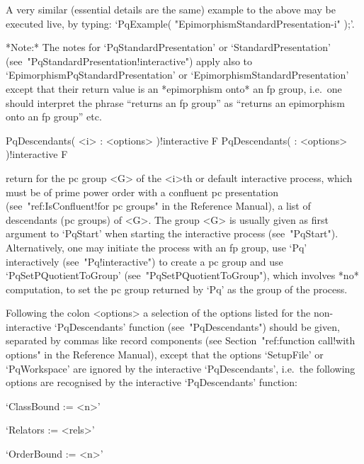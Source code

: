 A very similar (essential details are the same) example to the above may
be executed live, by typing:
`PqExample( "EpimorphismStandardPresentation-i" );'.

*Note:*
The  notes   for   `PqStandardPresentation'   or   `StandardPresentation'
(see~"PqStandardPresentation!interactive")      apply       also       to
`EpimorphismPqStandardPresentation' or  `EpimorphismStandardPresentation'
except that their return value is an  *epimorphism  onto*  an  fp  group,
i.e.~one should interpret the phrase ``returns an fp group'' as ``returns
an epimorphism onto an fp group'' etc.

\>PqDescendants( <i> : <options> )!{interactive} F
\>PqDescendants( : <options> )!{interactive} F

return for the pc group <G> of the <i>th or default interactive  {\ANUPQ}
process, which  must  be  of  prime  power  order  with  a  confluent  pc
presentation (see~"ref:IsConfluent!for pc groups" in the {\GAP} Reference
Manual), a list of descendants (pc groups)  of  <G>.  The  group  <G>  is
usually  given  as  first  argument  to  `PqStart'  when   starting   the
interactive {\ANUPQ}  process  (see~"PqStart").  Alternatively,  one  may
initiate  the  process  with  an  fp  group,   use   `Pq'   interactively
(see~"Pq!interactive")    to    create    a    pc    group    and     use
`PqSetPQuotientToGroup'  (see~"PqSetPQuotientToGroup"),  which   involves
*no* computation, to set the pc group returned by `Pq' as  the  group  of
the process.

Following the colon <options> a selection of the options listed  for  the
non-interactive `PqDescendants' function (see~"PqDescendants") should  be
given,   separated   by    commas    like    record    components    (see
Section~"ref:function call!with options" in the {\GAP} Reference Manual),
except that the options `SetupFile' or `PqWorkspace' are ignored  by  the
interactive `PqDescendants', i.e.~the following options are recognised by
the interactive `PqDescendants' function:

\beginlist%

\item{}`ClassBound := <n>'

\item{}`Relators := <rels>'

\item{}`OrderBound := <n>'

